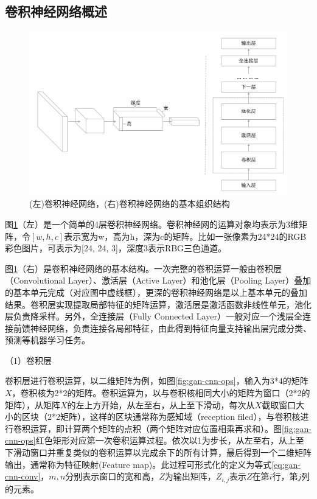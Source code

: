 \subsection{卷积神经网络概述}

\begin{figure}[H]
\centering
\includegraphics[scale=0.5]{figures/gan-cnn.png}
\caption{(左)卷积神经网络，(右)卷积神经网络的基本组织结构}
\label{fig:gan-cnn}
\end{figure}

图\ref{fig:gan-cnn}（左）是一个简单的4层卷积神经网络。卷积神经网的运算对象均表示为3维矩阵，令$[w, h, c]$表示宽为w，高为h，深为c的矩阵。比如一张像素为24*24的RGB彩色图片，可表示为[24, 24, 3]，深度3表示RBG三色通道。

图\ref{fig:gan-cnn}（右）是卷积神经网络的基本结构。一次完整的卷积运算一般由卷积层（Convolutional Layer）、激活层（Active Layer）和池化层（Pooling Layer）叠加的基本单元完成（对应图中虚线框），更深的卷积神经网络是以上基本单元的叠加结果。卷积层实现提取局部特征的矩阵运算，激活层是激活函数非线性单元，池化层负责降采样。另外，全连接层（Fully Connected Layer）一般对应一个浅层全连接前馈神经网络，负责连接各局部特征，由此得到特征向量支持输出层完成分类、预测等机器学习任务。

（1）卷积层

卷积层进行卷积运算，以二维矩阵为例，如图\ref{fig:gan-cnn-ops}，输入为3*4的矩阵$X$，卷积核为2*2的矩阵。卷积运算为，以与卷积核相同大小的矩阵为窗口（2*2的矩阵），从矩阵$X$的左上方开始，从左至右，从上至下滑动，每次从$X$截取窗口大小的区块（2*2矩阵），这样的区块通常称为感知域（reception filed），与卷积核进行卷积运算，即计算两个矩阵的点积（两个矩阵对应位置相乘再求和）。图\ref{fig:gan-cnn-ops}红色矩形对应第一次卷积运算过程。依次以1为步长，从左至右，从上至下滑动窗口并重复类似的卷积运算以完成余下的所有计算，最后得到一个二维矩阵输出，通常称为特征映射(Feature map)。此过程可形式化的定义为等式\ref{eq:gan-cnn-conv}，$m,n$分别表示窗口的宽和高，$Z$为输出矩阵，$Z_{i,j}$表示$Z$在第$i$行，第$j$列的元素。

